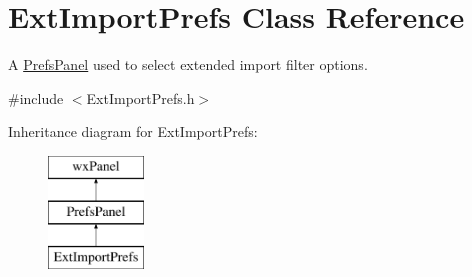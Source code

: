 \hypertarget{class_ext_import_prefs}{}\section{Ext\+Import\+Prefs Class Reference}
\label{class_ext_import_prefs}


A \hyperlink{class_prefs_panel}{Prefs\+Panel} used to select extended import filter options.  




{\ttfamily \#include $<$Ext\+Import\+Prefs.\+h$>$}

Inheritance diagram for Ext\+Import\+Prefs\+:\begin{figure}[H]
\begin{center}
\leavevmode
\includegraphics[height=3.000000cm]{class_ext_import_prefs}
\end{center}
\end{figure}
